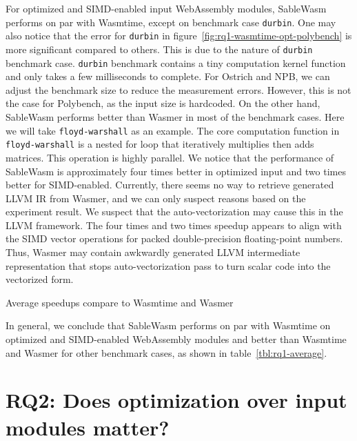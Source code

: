 For optimized and SIMD-enabled input WebAssembly modules, SableWasm performs on par with Wasmtime, except on benchmark case \texttt{durbin}. One may also notice that the error for \texttt{durbin} in figure~\ref{fig:rq1-wasmtime-opt-polybench} is more significant compared to others. This is due to the nature of \texttt{durbin} benchmark case. \texttt{durbin} benchmark contains a tiny computation kernel function and only takes a few milliseconds to complete.  For Ostrich and NPB, we can adjust the benchmark size to reduce the measurement errors. However, this is not the case for Polybench, as the input size is hardcoded. On the other hand, SableWasm performs better than Wasmer in most of the benchmark cases. Here we will take \texttt{floyd-warshall} as an example. The core computation function in \texttt{floyd-warshall} is a nested for loop that iteratively multiplies then adds matrices. This operation is highly parallel. We notice that the performance of SableWasm is approximately four times better in optimized input and two times better for SIMD-enabled. Currently, there seems no way to retrieve generated LLVM IR from Wasmer, and we can only suspect reasons based on the experiment result. We suspect that the auto-vectorization may cause this in the LLVM framework. The four times and two times speedup appears to align with the SIMD vector operations for packed double-precision floating-point numbers. Thus, Wasmer may contain awkwardly generated LLVM intermediate representation that stops auto-vectorization pass to turn scalar code into the vectorized form.

\begin{table}
    \centering
    
    \caption{Average speedups compare to Wasmtime and Wasmer}
    \label{tbl:rq1-average}
\end{table}

In general, we conclude that SableWasm performs on par with Wasmtime on optimized and SIMD-enabled WebAssembly modules and better than Wasmtime and Wasmer for other benchmark cases, as shown in table~\ref{tbl:rq1-average}.


\section[RQ2: Does optimization over input modules matter?]{
  {\large RQ2: Does optimization over input modules matter?}}

